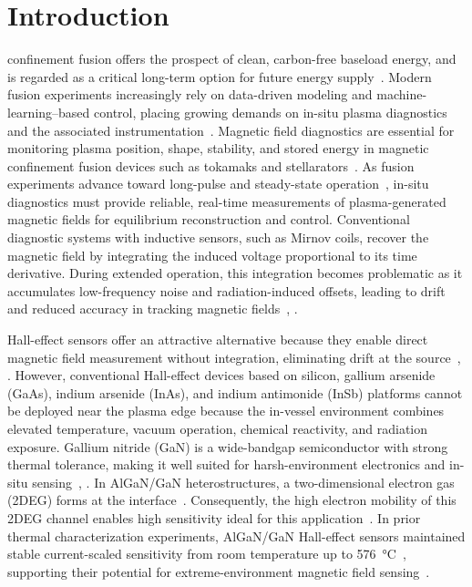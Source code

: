\documentclass{IEEE_lsens}
\begin{document}
\section{Introduction}
 confinement fusion offers the prospect of clean, carbon-free baseload energy, and is regarded as a critical long-term option for future energy supply~\cite{Ongena2016}. Modern fusion experiments increasingly rely on data-driven modeling and machine-learning--based control, placing growing demands on in-situ plasma diagnostics and the associated instrumentation~\cite{Degrave2022, Anirudh2023}. Magnetic field diagnostics are essential for monitoring plasma position, shape, stability, and stored energy in magnetic confinement fusion devices such as tokamaks and stellarators~\cite{ref1}. As fusion experiments advance toward long-pulse and steady-state operation~\cite{ref2}, in-situ diagnostics must provide reliable, real-time measurements of plasma-generated magnetic fields for equilibrium reconstruction and control. Conventional diagnostic systems with inductive sensors, such as Mirnov coils, recover the magnetic field by integrating the induced voltage proportional to its time derivative. During extended operation, this integration becomes problematic as it accumulates low-frequency noise and radiation-induced offsets, leading to drift and reduced accuracy in tracking magnetic fields~\cite{ref3}, \cite{ref4}.

Hall-effect sensors offer an attractive alternative because they enable direct magnetic field measurement without integration, eliminating drift at the source~\cite{ref5}, \cite{ref6}. However, conventional Hall-effect devices based on silicon, gallium arsenide (GaAs), indium arsenide (InAs), and indium antimonide (InSb) platforms cannot be deployed near the plasma edge because the in-vessel environment combines elevated temperature, vacuum operation, chemical reactivity, and radiation exposure. Gallium nitride (GaN) is a wide-bandgap semiconductor with strong thermal tolerance, making it well suited for harsh-environment electronics and in-situ sensing~\cite{ref7}, \cite{ref8}. In AlGaN/GaN heterostructures, a two-dimensional electron gas (2DEG) forms at the interface~\cite{ref9}. Consequently, the high electron mobility of this 2DEG channel enables high sensitivity ideal for this application~\cite{ref10}. In prior thermal characterization experiments, AlGaN/GaN Hall-effect sensors maintained stable current-scaled sensitivity from room temperature up to \SI{576}{\degreeCelsius}~\cite{ref11}, supporting their potential for extreme-environment magnetic field sensing~\cite{ref12}.
\end{document}
